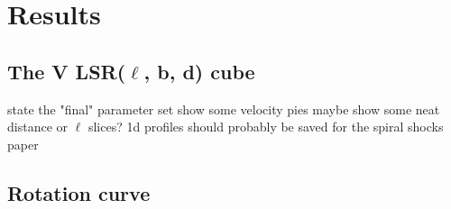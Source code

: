 \section{Results}

\subsection{The V LSR($\ell$, b, d) cube}
state the "final" parameter set
show some velocity pies
maybe show some neat distance or $\ell$ slices? 1d profiles should probably be saved for the spiral shocks paper

\subsection{Rotation curve}